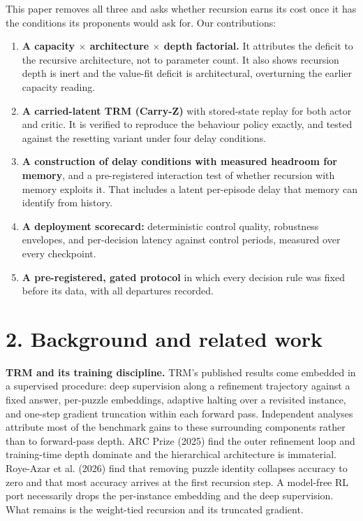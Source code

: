 \documentclass[11pt]{article}
\begin{document}
This paper removes all three and asks whether recursion earns its cost once it has the conditions its proponents would ask for. Our contributions:



\begin{enumerate}
\item \textbf{A capacity $\times$ architecture $\times$ depth factorial.} It attributes the deficit to the recursive architecture, not to parameter count. It also shows recursion depth is inert and the value-fit deficit is architectural, overturning the earlier capacity reading.
\item \textbf{A carried-latent TRM (Carry-Z)} with stored-state replay for both actor and critic. It is verified to reproduce the behaviour policy exactly, and tested against the resetting variant under four delay conditions.
\item \textbf{A construction of delay conditions with measured headroom for memory}, and a pre-registered interaction test of whether recursion with memory exploits it. That includes a latent per-episode delay that memory can identify from history.
\item \textbf{A deployment scorecard:} deterministic control quality, robustness envelopes, and per-decision latency against control periods, measured over every checkpoint.
\item \textbf{A pre-registered, gated protocol} in which every decision rule was fixed before its data, with all departures recorded.
\end{enumerate}



\section*{2. Background and related work}



\textbf{TRM and its training discipline.} TRM's published results come embedded in a supervised procedure: deep supervision along a refinement trajectory against a fixed answer, per-puzzle embeddings, adaptive halting over a revisited instance, and one-step gradient truncation within each forward pass. Independent analyses attribute most of the benchmark gains to these surrounding components rather than to forward-pass depth. ARC Prize (2025) find the outer refinement loop and training-time depth dominate and the hierarchical architecture is immaterial. Roye-Azar et al. (2026) find that removing puzzle identity collapses accuracy to zero and that most accuracy arrives at the first recursion step. A model-free RL port necessarily drops the per-instance embedding and the deep supervision. What remains is the weight-tied recursion and its truncated gradient.
\end{document}
